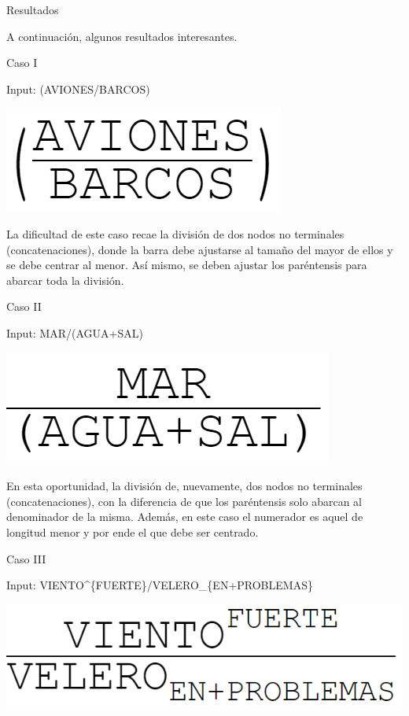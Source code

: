 \begin{section}{Resultados}

A continuaci\'on, algunos resultados interesantes.

\begin{subsection}{Caso I}

Input: (AVIONES/BARCOS)

\includegraphics[scale=0.5]{./imgs/aviones.png}

La dificultad de este caso recae la divisi\'on de dos nodos no terminales (concatenaciones), donde la barra debe ajustarse al tama\~no del mayor de ellos y se debe centrar al menor. As\'i mismo, se deben ajustar los par\'entensis para abarcar toda la divisi\'on. 

\end{subsection}

\begin{subsection}{Caso II}

Input: MAR/(AGUA+SAL)

\includegraphics[scale=0.5]{./imgs/mar.png}

En esta oportunidad, la divisi\'on de, nuevamente, dos nodos no terminales (concatenaciones), con la diferencia de que los par\'entensis solo abarcan al denominador de la misma. Adem\'as, en este caso el numerador es aquel de longitud menor y por ende el que debe ser centrado.

\end{subsection}
\begin{subsection}{Caso III}

Input: VIENTO\^{}\{FUERTE\}/VELERO\_\{EN+PROBLEMAS\}

\includegraphics[scale=0.5]{./imgs/velero.png}


\end{subsection}
\end{section}
